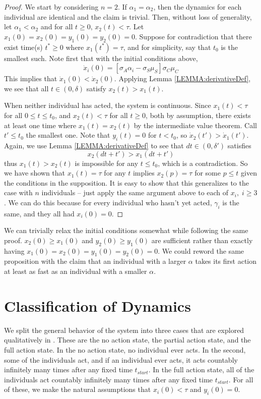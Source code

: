 \documentclass[preprint,12pt]{elsarticle}
\begin{document}
\begin{proof} We start by considering $n=2$. If $\alpha_1 = \alpha_2$, then the dynamics for each individual are identical and the claim is trivial. Then, without loss of generality, let $\alpha_1 < \alpha_2$ and for all $t \geq 0$, $x_2(t) < \tau$. Let $x_1(0) = x_2(0) = y_1(0) = y_2(0) = 0$. Suppose for contradiction that there exist time(s) $t^* \geq 0$ where $x_1(t^*) = \tau$, and for simplicity, say that $t_0$ is the smallest such. Note first that with the initial conditions above,
\[
\dot x_i(0) = [\sigma_A \alpha_i - \sigma_S \mu_S]\sigma_C\mu_C\]
This implies that $\dot x_1(0) < \dot x_2(0)$. Applying Lemma \ref{LEMMA:derivativeDef}, we see that all $t \in (0, \delta)$ satisfy $x_2(t) > x_1(t)$.

When neither individual has acted, the system is continuous. Since $x_1(t) < \tau$ for all $0 \leq t \leq t_0$, and $x_2(t) < \tau$ for all $ t \geq 0$, both by assumption, there exists at least one time where $x_1(t) = x_2(t)$ by the intermediate value theorem. Call $t' \leq t_0$ the smallest one. Note that $y_i(t) = 0$ for $t < t_0$, so $\dot x_2(t') > \dot x_1(t')$. Again, we use Lemma \ref{LEMMA:derivativeDef} to see that $dt \in (0,\delta')$ satisfies \[
x_2(dt + t') > x_1(dt + t')
\]
thus $x_1(t) > x_2(t)$ is impossible for any $t \leq t_0$, which is a contradiction. So we have shown that $x_1(t) = \tau$ for any $t$ implies $x_2(p) = \tau$ for some $p \leq t$ given the conditions in the supposition. It is easy to show that this generalizes to the case with $n$ individuals -- just apply the same argument above to each of $x_i, \; i \geq 3$. We can do this because for every individual who hasn't yet acted, $\gamma_i$ is the same, and they all had $x_i(0) = 0$. \end{proof}
We can trivially relax the initial conditions somewhat while following the same proof. $x_2(0) \geq x_1(0)$ and $y_2(0) \geq y_1(0)$ are sufficient rather than exactly having $x_1(0) = x_2(0) = y_1(0) = y_2(0) = 0$. We could reword the same proposition with the claim that an individual with a larger $\alpha$ takes its first action at least as fast as an individual with a smaller $\alpha$.

\section{Classification of Dynamics}\label{sec:ClassificationOfDynamics}

We split the general behavior of the system into three cases that are explored qualitatively in \cite{schwarze2024planned}. These are the no action state, the partial action state, and the full action state. In the no action state, no individual ever acts. In the second, some of the individuals act, and if an individual ever acts, it acts countably infinitely many times after any fixed time $t_{start}$. In the full action state, all of the individuals act countably infinitely many times after any fixed time $t_{start}$. For all of these, we make the natural assumptions that $x_i(0) < \tau$ and $y_i(0) = 0$.
\end{document}
